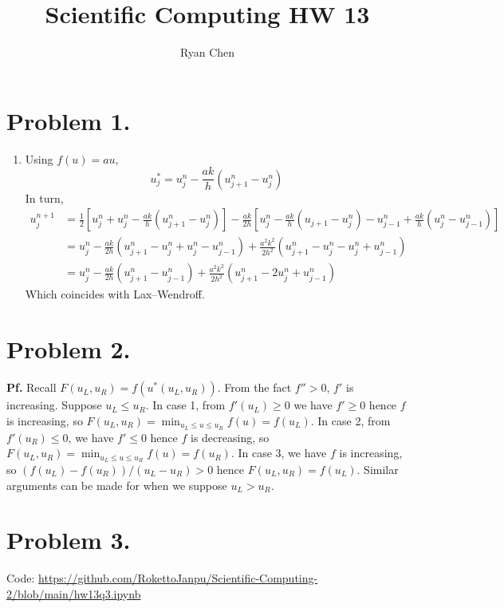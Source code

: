 \documentclass{article}
\title{Scientific Computing HW 13}
\author{Ryan Chen}
\def\tbf#1{\textbf{#1}}
\newcommand{\sbr}[1]{\left[#1\right]}
\newcommand{\pf}{\tbf{Pf. }}
\begin{document}
	
\maketitle



\section*{Problem 1.}

\begin{enumerate}[label=(\alph*)]
	
\item Using $f(u)=au$,
$$u_j^* = u_j^n - \frac{ak}{h}(u_{j+1}^n - u_j^n)$$
In turn,
\begin{align*}
	u_j^{n+1} &= \frac12\sbr{u_j^n + u_j^n - \frac{ak}{h}(u_{j+1}^n - u_j^n)} - \frac{ak}{2h}\sbr{u_j^n - \frac{ak}{h}(u_{j+1} - u_j^n) - u_{j-1}^n + \frac{ak}{h}(u_j^n - u_{j-1}^n)}\\
	&= u_j^n - \frac{ak}{2h}(u_{j+1}^n - u_j^n + u_j^n - u_{j-1}^n) + \frac{a^2k^2}{2h^2}(u_{j+1}^n - u_j^n - u_j^n + u_{j-1}^n)\\
	&= u_j^n - \frac{ak}{2h}(u_{j+1}^n - u_{j-1}^n) + \frac{a^2k^2}{2h^2}(u_{j+1}^n - 2u_j^n + u_{j-1}^n)
\end{align*}
Which coincides with Lax--Wendroff.
 
\end{enumerate}



\section*{Problem 2.}

\pf Recall $F(u_L,u_R)=f(u^*(u_L,u_R))$. From the fact $f''>0$, $f'$ is increasing. Suppose $u_L\le u_R$. In case 1, from $f'(u_L)\ge0$ we have $f'\ge0$ hence $f$ is increasing, so $F(u_L,u_R)=\min_{u_L\le u\le u_R}f(u)=f(u_L)$. In case 2, from $f'(u_R)\le0$, we have $f'\le0$ hence $f$ is decreasing, so $F(u_L,u_R)=\min_{u_L\le u\le u_R}f(u)=f(u_R)$. In case 3, we have $f$ is increasing, so $(f(u_L)-f(u_R))/(u_L-u_R)>0$ hence $F(u_L,u_R)=f(u_L)$. Similar arguments can be made for when we suppose $u_L>u_R$.



\section*{Problem 3.}

Code: \url{https://github.com/RokettoJanpu/Scientific-Computing-2/blob/main/hw13q3.ipynb}
\end{document}
